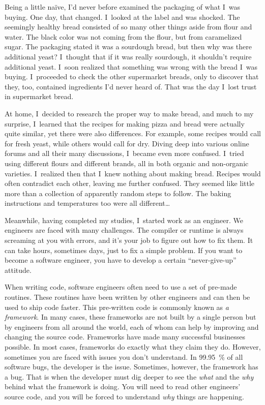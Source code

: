 Being a little naïve, I'd never before examined the packaging of what I~was
buying. One day, that changed.  I~looked at the label and was shocked. The
seemingly
healthy bread consisted of so many other things aside from flour and water.
The black color was not coming from the flour, but from caramelized sugar.
The packaging stated it was a sourdough bread, but then why was there additional yeast?
I~thought that if it was really sourdough, it shouldn't require additional
yeast. I~soon
realized that something was wrong with the bread I~was buying.
I~proceeded to check the other supermarket breads, only to discover that they, too,
contained ingredients I'd never heard of. That was the day I~lost trust
in supermarket bread.

At home, I~decided to research the proper way to make bread, and much to my surprise,
I~learned that the recipes for making pizza and bread were actually quite similar, yet
there were also differences. For example, some recipes would call for fresh yeast, while
others would call for dry. Diving deep into various online forums and all their many
discussions, I~became even more confused.
I~tried using different flours and different brands, all in both organic and non-organic varieties.
I~realized then that I~knew nothing about making bread. Recipes would often contradict each other,
leaving me further confused. They seemed like little more than a collection of apparently random
steps to follow. The baking instructions and temperatures too were all
different\dots

Meanwhile, having completed my studies, I~started work as an engineer.
We engineers are faced with many challenges. The compiler or runtime is
always screaming at you with errors, and it's your job to figure out how to fix them.
It can take hours, sometimes days, just to fix a simple problem. If you want
to become a software engineer, you have to develop a certain ``never-give-up'' attitude.

When writing code, software engineers often need to use a set of pre-made routines. These routines have been
written by other engineers and can then be used to ship code faster.
This pre-written code is commonly known as \emph{a framework}. In many cases,
these frameworks are not built by a single person but by engineers from all around the world,
each of whom can help by improving and changing the source code. Frameworks have made many successful
businesses possible.
In most cases, frameworks do exactly what they claim they do. However,
sometimes you are faced with issues you don't understand. In \qty{99.95}{\percent}
of all software bugs, the developer is the issue. Sometimes, however, the framework has a
bug. That is when the developer must dig deeper to see the \emph{what} and the
\emph{why} behind what
the framework is doing. You will need to read other engineers' source code, and you will be forced
to understand \emph{why} things are happening.

